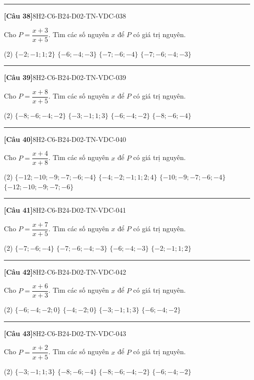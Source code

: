 \documentclass[12pt,a4paper]{article}
\newif\ifloigiai
\newenvironment{cauhoi}[2]{%
  \par\medskip\noindent\rule{\textwidth}{0.4pt}\par\nopagebreak
  \noindent\textbf{[#1]}\hfill{\scriptsize\ttfamily #2}\par\nopagebreak\smallskip}{\par}
\newcommand{\dapan}[1]{\ifloigiai\par\smallskip\noindent\textit{Đáp án:} \textbf{#1}\par\fi}
\begin{document}
\begin{cauhoi}{Câu 38}{8H2-C6-B24-D02-TN-VDC-038}
Cho $P=\dfrac{x+3}{x+5}$. Tìm các số nguyên $x$ để $P$ có giá trị nguyên.
\begin{tasks}(2)
\task $\{-2; -1; 1; 2\}$
\task $\{-6; -4; -3\}$
\task $\{-7; -6; -4\}$
\task $\{-7; -6; -4; -3\}$
\end{tasks}
\dapan{D}
\end{cauhoi}
\begin{cauhoi}{Câu 39}{8H2-C6-B24-D02-TN-VDC-039}
Cho $P=\dfrac{x+8}{x+5}$. Tìm các số nguyên $x$ để $P$ có giá trị nguyên.
\begin{tasks}(2)
\task $\{-8; -6; -4; -2\}$
\task $\{-3; -1; 1; 3\}$
\task $\{-6; -4; -2\}$
\task $\{-8; -6; -4\}$
\end{tasks}
\dapan{A}
\end{cauhoi}
\begin{cauhoi}{Câu 40}{8H2-C6-B24-D02-TN-VDC-040}
Cho $P=\dfrac{x+4}{x+8}$. Tìm các số nguyên $x$ để $P$ có giá trị nguyên.
\begin{tasks}(2)
\task $\{-12; -10; -9; -7; -6; -4\}$
\task $\{-4; -2; -1; 1; 2; 4\}$
\task $\{-10; -9; -7; -6; -4\}$
\task $\{-12; -10; -9; -7; -6\}$
\end{tasks}
\dapan{A}
\end{cauhoi}
\begin{cauhoi}{Câu 41}{8H2-C6-B24-D02-TN-VDC-041}
Cho $P=\dfrac{x+7}{x+5}$. Tìm các số nguyên $x$ để $P$ có giá trị nguyên.
\begin{tasks}(2)
\task $\{-7; -6; -4\}$
\task $\{-7; -6; -4; -3\}$
\task $\{-6; -4; -3\}$
\task $\{-2; -1; 1; 2\}$
\end{tasks}
\dapan{B}
\end{cauhoi}
\begin{cauhoi}{Câu 42}{8H2-C6-B24-D02-TN-VDC-042}
Cho $P=\dfrac{x+6}{x+3}$. Tìm các số nguyên $x$ để $P$ có giá trị nguyên.
\begin{tasks}(2)
\task $\{-6; -4; -2; 0\}$
\task $\{-4; -2; 0\}$
\task $\{-3; -1; 1; 3\}$
\task $\{-6; -4; -2\}$
\end{tasks}
\dapan{A}
\end{cauhoi}
\begin{cauhoi}{Câu 43}{8H2-C6-B24-D02-TN-VDC-043}
Cho $P=\dfrac{x+2}{x+5}$. Tìm các số nguyên $x$ để $P$ có giá trị nguyên.
\begin{tasks}(2)
\task $\{-3; -1; 1; 3\}$
\task $\{-8; -6; -4\}$
\task $\{-8; -6; -4; -2\}$
\task $\{-6; -4; -2\}$
\end{tasks}
\dapan{C}
\end{cauhoi}
\end{document}
